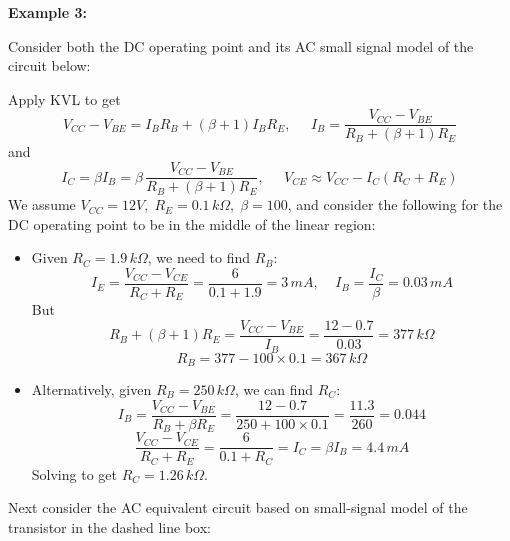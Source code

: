 \documentclass{article}
\begin{document}
{\bf Example 3:}

Consider both the DC operating point and its AC small signal model of the
circuit below:


Apply KVL to get
\begin{equation}
V_{CC}-V_{BE}=I_B R_B+(\beta+1)I_BR_E,\;\;\;\;\;
I_B=\frac{V_{CC}-V_{BE}}{R_B+(\beta+1)R_E}
\end{equation}
and
\begin{equation}
I_C=\beta I_B=\beta\,\frac{V_{CC}-V_{BE}}{R_B+(\beta+1)R_E},\;\;\;\;\;
V_{CE}\approx V_{CC}-I_C(R_C+R_E)
\end{equation}
We assume $V_{CC}=12V,\;R_E=0.1\,k\Omega,\;\beta=100$, and consider the
following for the DC operating point to be in the middle of the linear 
region:
\begin{itemize}
\item Given $R_C=1.9\,k\Omega$, we need to find $R_B$:
  \begin{equation}
  I_E=\frac{V_{CC}-V_{CE}}{R_C+R_E}=\frac{6}{0.1+1.9}=3\,mA,\;\;\;\;
  I_B=\frac{I_C}{\beta}=0.03\,mA
  \end{equation}
  But 
  \begin{equation}
  R_B+(\beta+1)R_E=\frac{V_{CC}-V_{BE}}{I_B}=\frac{12-0.7}{0.03}=377\,k\Omega
  \end{equation}
  \begin{equation}
  R_B=377-100\times 0.1=367\,k\Omega
  \end{equation}
\item Alternatively, given $R_B=250\,k\Omega$, we can find $R_C$:
  \begin{equation}
  I_B=\frac{V_{CC}-V_{BE}}{R_B+\beta R_E}
  =\frac{12-0.7}{250+100\times 0.1}=\frac{11.3}{260}=0.044
  \end{equation}
  \begin{equation}
  \frac{V_{CC}-V_{CE}}{R_C+R_E}=\frac{6}{0.1+R_C}=I_C=\beta I_B=4.4\,mA
  \end{equation}
  Solving to get $R_C=1.26\,k\Omega$.
\end{itemize}

Next consider the AC equivalent circuit based on small-signal model of the
transistor in the dashed line box:

\end{document}
